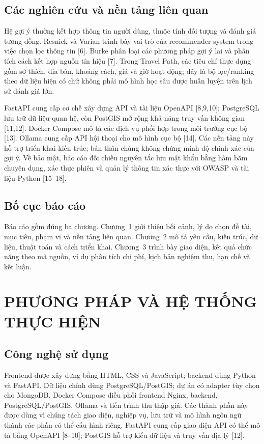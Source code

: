 \documentclass[12pt,a4paper,oneside]{report}
\begin{document}
\section{Các nghiên cứu và nền tảng liên quan}
Hệ gợi ý thường kết hợp thông tin người dùng, thuộc tính đối tượng và đánh giá tương đồng. Resnick và Varian trình bày vai trò của recommender system trong việc chọn lọc thông tin [6]. Burke phân loại các phương pháp gợi ý lai và phân tích cách kết hợp nguồn tín hiệu [7]. Trong Travel Path, các tiêu chí thực dụng gồm sở thích, địa bàn, khoảng cách, giá và giờ hoạt động; đây là bộ lọc/ranking theo dữ liệu hiện có chứ không phải mô hình học sâu được huấn luyện trên lịch sử đánh giá lớn.

FastAPI cung cấp cơ chế xây dựng API và tài liệu OpenAPI [8,9,10]; PostgreSQL lưu trữ dữ liệu quan hệ, còn PostGIS mở rộng khả năng truy vấn không gian [11,12]. Docker Compose mô tả các dịch vụ phối hợp trong môi trường cục bộ [13]. Ollama cung cấp API hội thoại cho mô hình cục bộ [14]. Các nền tảng này hỗ trợ triển khai kiến trúc; bản thân chúng không chứng minh độ chính xác của gợi ý. Về bảo mật, báo cáo đối chiếu nguyên tắc lưu mật khẩu bằng hàm băm chuyên dụng, xác thực phiên và quản lý thông tin xác thực với OWASP và tài liệu Python [15--18].

\section{Bố cục báo cáo}
Báo cáo gồm đúng ba chương. Chương~1 giới thiệu bối cảnh, lý do chọn đề tài, mục tiêu, phạm vi và nền tảng liên quan. Chương~2 mô tả yêu cầu, kiến trúc, dữ liệu, thuật toán và cách triển khai. Chương~3 trình bày giao diện, kết quả chức năng theo mã nguồn, ví dụ phân tích chi phí, kịch bản nghiệm thu, hạn chế và kết luận.

\chapter{PHƯƠNG PHÁP VÀ HỆ THỐNG THỰC HIỆN}

\section{Công nghệ sử dụng}
Frontend được xây dựng bằng HTML, CSS và JavaScript; backend dùng Python và FastAPI. Dữ liệu chính dùng PostgreSQL/PostGIS; dự án có adapter tùy chọn cho MongoDB. Docker Compose điều phối frontend Nginx, backend, PostgreSQL/PostGIS, Ollama và tiến trình thu thập giá. Các thành phần này được dùng vì chúng tách giao diện, nghiệp vụ, lưu trữ và mô hình ngôn ngữ thành các phần có thể cấu hình riêng. FastAPI cung cấp giao diện API có thể mô tả bằng OpenAPI [8--10]; PostGIS hỗ trợ kiểu dữ liệu và truy vấn địa lý [12].
\end{document}
